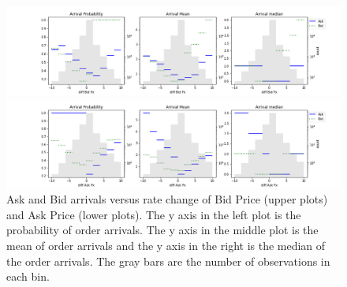 \documentclass[letterpaper,12pt]{article}
\numberwithin{equation}{section}
\begin{document}
\begin{figure}[H]
    \hspace*{-0.6in}
    \includegraphics[scale = 0.5]{figs/densities/density_diff Bid Px.png}
    
    \hspace*{-0.6in}\includegraphics[scale = 0.5]{figs/densities/density_diff Ask Px.png}
    \caption{\small Ask and Bid arrivals versus rate change of Bid Price (upper plots) and Ask Price (lower plots). The y axis in the left plot is the probability of order arrivals. The y axis in the middle plot is the mean of order arrivals and the y axis in the right is the median of the order arrivals. The gray bars are the number of observations in each bin. }
    \label{sec3:fig:bid_ask_price}
\end{figure}
\end{document}
